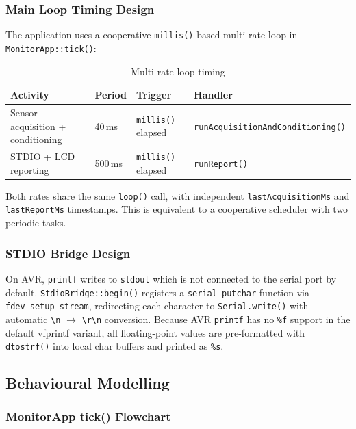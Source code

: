 \documentclass[12pt]{article}
\begin{document}
\subsubsection{Main Loop Timing Design}

The application uses a cooperative \texttt{millis()}-based multi-rate loop in \texttt{MonitorApp::tick()}:

\begin{table}[H]
\centering
\begin{tabular}{llll}
\toprule
\textbf{Activity} & \textbf{Period} & \textbf{Trigger} & \textbf{Handler} \\
\midrule
Sensor acquisition + conditioning & 40\,ms & \texttt{millis()} elapsed & \texttt{runAcquisitionAndConditioning()} \\
STDIO + LCD reporting & 500\,ms & \texttt{millis()} elapsed & \texttt{runReport()} \\
\bottomrule
\end{tabular}
\caption{Multi-rate loop timing}
\label{tab:timing}
\end{table}

Both rates share the same \texttt{loop()} call, with independent \texttt{lastAcquisitionMs} and \texttt{lastReportMs} timestamps. This is equivalent to a cooperative scheduler with two periodic tasks.

\subsubsection{STDIO Bridge Design}

On AVR, \texttt{printf} writes to \texttt{stdout} which is not connected to the serial port by default. \texttt{StdioBridge::begin()} registers a \texttt{serial\_putchar} function via \texttt{fdev\_setup\_stream}, redirecting each character to \texttt{Serial.write()} with automatic \texttt{\textbackslash{}n} $\rightarrow$ \texttt{\textbackslash{}r\textbackslash{}n} conversion. Because AVR \texttt{printf} has no \texttt{\%f} support in the default vfprintf variant, all floating-point values are pre-formatted with \texttt{dtostrf()} into local char buffers and printed as \texttt{\%s}.

\subsection{Behavioural Modelling}

\subsubsection{MonitorApp tick() Flowchart}
\end{document}
